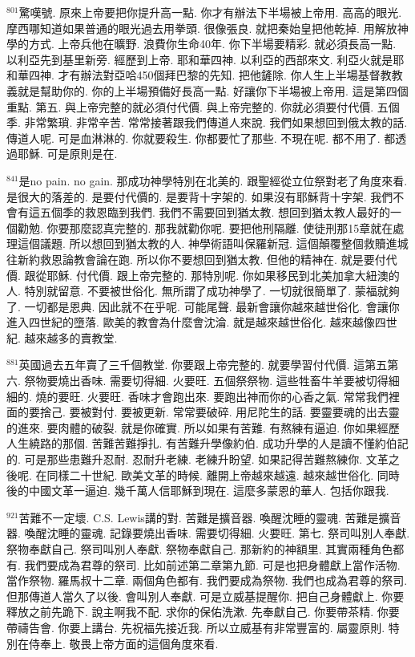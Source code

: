 \documentclass{book}
\begin{document}
$^{801}$驚嘆號.
原來上帝要把你提升高一點.
你才有辦法下半場被上帝用.
高高的眼光.
摩西哪知道如果普通的眼光過去用拳頭.
很像張良.
就把秦始皇把他乾掉.
用解放神學的方式.
上帝兵他在曠野.
浪費你生命40年.
你下半場要精彩.
就必須長高一點.
以利亞先到基里新旁.
經歷到上帝.
耶和華四神.
以利亞的西部來文.
利亞火就是耶和華四神.
才有辦法對亞哈450個拜巴黎的先知.
把他鏟除.
你人生上半場基督教教義就是幫助你的.
你的上半場預備好長高一點.
好讓你下半場被上帝用.
這是第四個重點.
第五.
與上帝完整的就必須付代價.
與上帝完整的.
你就必須要付代價.
五個季.
非常繁瑣.
非常辛苦.
常常接著跟我們傳道人來說.
我們如果想回到俄太教的話.
傳道人呢.
可是血淋淋的.
你就要殺生.
你都要忙了那些.
不現在呢.
都不用了.
都透過耶穌.
可是原則是在.

$^{841}$是no pain.
no gain.
那成功神學特別在北美的.
跟聖經從立位祭對老了角度來看.
是很大的落差的.
是要付代價的.
是要背十字架的.
如果沒有耶穌背十字架.
我們不會有這五個季的救恩臨到我們.
我們不需要回到猶太教.
想回到猶太教人最好的一個勸勉.
你要那麼認真完整的.
那我就勸你呢.
要把他刑隔離.
使徒刑那15章就在處理這個議題.
所以想回到猶太教的人.
神學術語叫保羅新冠.
這個顛覆整個救贖進城往新約救恩論教會論在跑.
所以你不要想回到猶太教.
但他的精神在.
就是要付代價.
跟從耶穌.
付代價.
跟上帝完整的.
那特別呢.
你如果移民到北美加拿大紐澳的人.
特別就留意.
不要被世俗化.
無所謂了成功神學了.
一切就很簡單了.
蒙福就夠了.
一切都是恩典.
因此就不在乎呢.
可能尾聲.
最新會讓你越來越世俗化.
會讓你進入四世紀的墮落.
歐美的教會為什麼會沈淪.
就是越來越世俗化.
越來越像四世紀.
越來越多的賣教堂.

$^{881}$英國過去五年賣了三千個教堂.
你要跟上帝完整的.
就要學習付代價.
這第五第六.
祭物要燒出香味.
需要切得細.
火要旺.
五個祭祭物.
這些牲畜牛羊要被切得細細的.
燒的要旺.
火要旺.
香味才會跑出來.
要跑出神而你的心香之氣.
常常我們裡面的要捨己.
要被對付.
要被更新.
常常要破碎.
用尼陀生的話.
要靈要魂的出去靈的進來.
要肉體的破裂.
就是你確實.
所以如果有苦難.
有熬練有逼迫.
你如果經歷人生繞路的那個.
苦難苦難掙扎.
有苦難升學像約伯.
成功升學的人是讀不懂約伯記的.
可是那些患難升忍耐.
忍耐升老練.
老練升盼望.
如果記得苦難熬練你.
文革之後呢.
在同樣二十世紀.
歐美文革的時候.
離開上帝越來越遠.
越來越世俗化.
同時後的中國文革一逼迫.
幾千萬人信耶穌到現在.
這麼多蒙恩的華人.
包括你跟我.

$^{921}$苦難不一定壞.
C.S. Lewis講的對.
苦難是擴音器.
喚醒沈睡的靈魂.
苦難是擴音器.
喚醒沈睡的靈魂.
記錄要燒出香味.
需要切得細.
火要旺.
第七.
祭司叫別人奉獻.
祭物奉獻自己.
祭司叫別人奉獻.
祭物奉獻自己.
那新約的神額里.
其實兩種角色都有.
我們要成為君尊的祭司.
比如前述第二章第九節.
可是也把身體獻上當作活物.
當作祭物.
羅馬叔十二章.
兩個角色都有.
我們要成為祭物.
我們也成為君尊的祭司.
但那傳道人當久了以後.
會叫別人奉獻.
可是立威基提醒你.
把自己身體獻上.
你要釋放之前先跪下.
說主啊我不配.
求你的保佑洗漱.
先奉獻自己.
你要帶茶精.
你要帶禱告會.
你要上講台.
先祝福先接近我.
所以立威基有非常豐富的.
屬靈原則.
特別在侍奉上.
敬畏上帝方面的這個角度來看.
\end{document}
